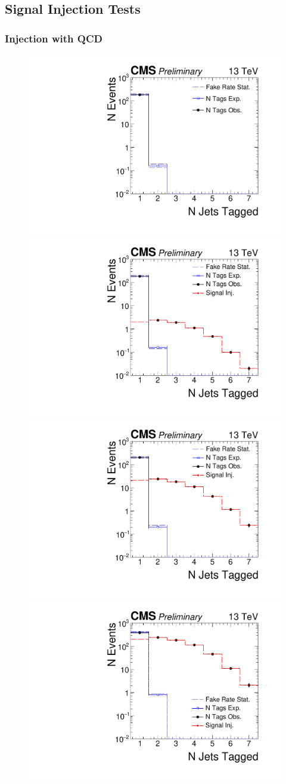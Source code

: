 \subsection{Signal Injection Tests} 

\subsubsection{Injection with QCD}


\begin{figure}
\begin{center}
\includegraphics[width=.45\textwidth]{figures/an/ANALYSIS/76x_pu/INJECTION/qcd_loose_displacedEvtSel_0eV.pdf}\\
\includegraphics[width=.45\textwidth]{figures/an/ANALYSIS/76x_pu/INJECTION/qcd_loose_displacedEvtSel_10eV.pdf}
\includegraphics[width=.45\textwidth]{figures/an/ANALYSIS/76x_pu/INJECTION/qcd_loose_displacedEvtSel_100eV.pdf}\\
\includegraphics[width=.45\textwidth]{figures/an/ANALYSIS/76x_pu/INJECTION/qcd_loose_displacedEvtSel_1000eV.pdf}

\end{center}
\end{figure}
